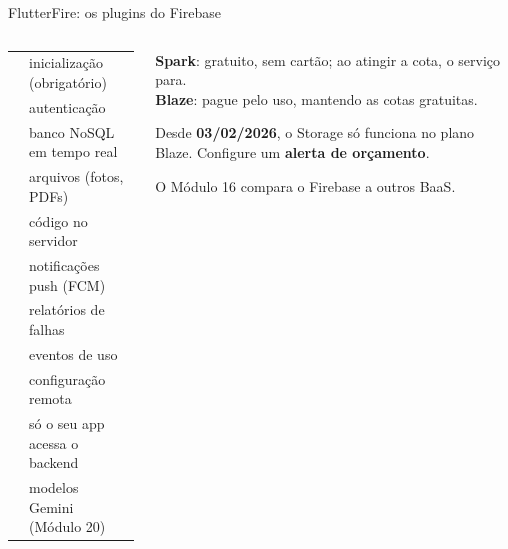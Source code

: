 \documentclass[aspectratio=169,10pt]{beamer}
\begin{document}
\begin{frame}{FlutterFire: os plugins do Firebase}
  \begin{columns}[T]
    \begin{column}{0.56\textwidth}
      \scriptsize
      \begin{tabularx}{\linewidth}{@{}p{3.1cm} L@{}}
        \toprule
         &  \\
        \midrule
         & inicialização (obrigatório) \\
         & autenticação \\
         & banco NoSQL em tempo real \\
         & arquivos (fotos, PDFs) \\
         & código no servidor \\
         & notificações push (FCM) \\
         & relatórios de falhas \\
         & eventos de uso \\
         & configuração remota \\
         & só o seu app acessa o backend \\
         & modelos Gemini (Módulo 20) \\
        \bottomrule
      \end{tabularx}
    \end{column}
    \begin{column}{0.42\textwidth}
      \begin{conceito}[Planos]
        \textbf{Spark}: gratuito, sem cartão; ao atingir a cota, o serviço para.\\
        \textbf{Blaze}: pague pelo uso, mantendo as cotas gratuitas.
      \end{conceito}
      \begin{atencao}
        Desde \textbf{03/02/2026}, o Storage só funciona no plano Blaze. Configure um \textbf{alerta de orçamento}.
      \end{atencao}
      \begin{dica}
        O Módulo 16 compara o Firebase a outros BaaS.
      \end{dica}
    \end{column}
  \end{columns}
\end{frame}
\end{document}
